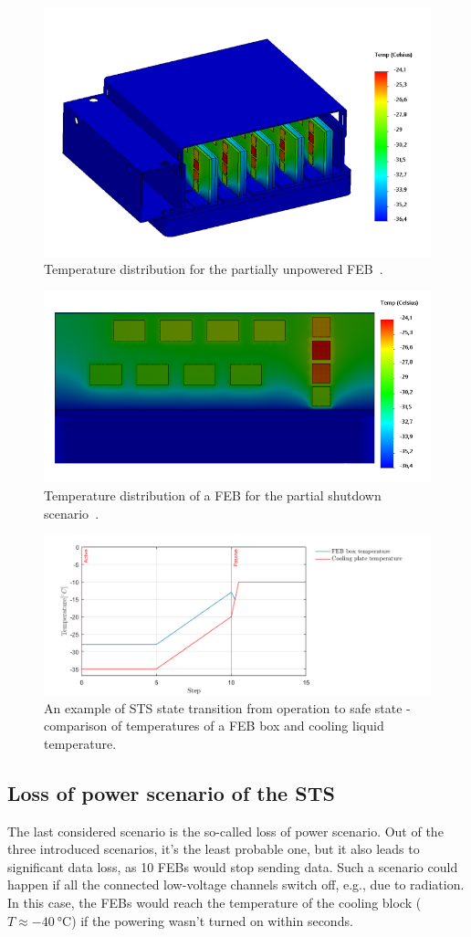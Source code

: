 \begin{figure}[!h]
\centering
\includegraphics[width=0.57\columnwidth]{Chapter4/images/reboot_box.png}
\caption{Temperature distribution for the partially unpowered \gls{FEB}~\cite{Agarwal}.}
\label{fig_reboot_box}
\end{figure}

\begin{figure}[!h]
\centering
\includegraphics[width=0.6\columnwidth]{Chapter4/images/reboot_FEB.png}
\caption{Temperature distribution of a \gls{FEB} for the partial shutdown scenario~\cite{Agarwal}.}
\label{fig_reboot_FEB}
\end{figure}

\begin{figure}[!h]
\centering
\includegraphics[width=0.85\columnwidth]{Chapter4/images/nominal.png}
\caption{An example of \gls{STS} state transition from operation to safe state - comparison of temperatures of a \gls{FEB} box and cooling liquid temperature.}
\label{fig_reboot_nominal2}
\end{figure}

\subsection{Loss of power scenario of the STS}
\label{power_loss}
The last considered scenario is the so-called loss of power scenario. Out of the three introduced scenarios, it's the least probable one, but it also leads to significant data loss, as 10 \glspl{FEB} would stop sending data. Such a scenario could happen if all the connected low-voltage channels switch off, e.g., due to radiation. In this case, the \glspl{FEB} would reach the temperature of the cooling block ($T \approx \SI{-40}{\celsius}$) if the powering wasn't turned on within seconds.

